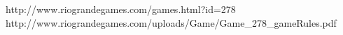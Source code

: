 \documentclass[12pt,a4paper,notitlepage]{article}
\begin{document}
\begin{thebibliography}{9}
 http://www.riograndegames.com/games.html?id=278
 http://www.riograndegames.com/uploads/Game/Game\_278\_gameRules.pdf
\end{thebibliography}
\end{document}
